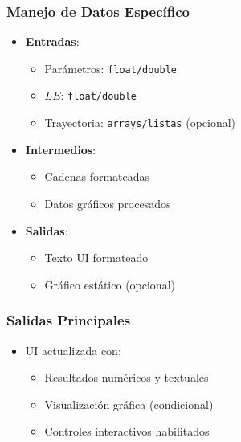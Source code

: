 \subsubsection{Manejo de Datos Específico}
\begin{itemize}
    \item \textbf{Entradas}:
    \begin{itemize}
        \item Parámetros: \texttt{float/double}
        \item $LE$: \texttt{float/double}
        \item Trayectoria: \texttt{arrays/listas} (opcional)
    \end{itemize}
    \item \textbf{Intermedios}:
    \begin{itemize}
        \item Cadenas formateadas
        \item Datos gráficos procesados
    \end{itemize}
    \item \textbf{Salidas}:
    \begin{itemize}
        \item Texto UI formateado
        \item Gráfico estático (opcional)
    \end{itemize}
\end{itemize}

\subsubsection{Salidas Principales}
\begin{itemize}
    \item UI actualizada con:
    \begin{itemize}
        \item Resultados numéricos y textuales
        \item Visualización gráfica (condicional)
        \item Controles interactivos habilitados
    \end{itemize}
\end{itemize}

